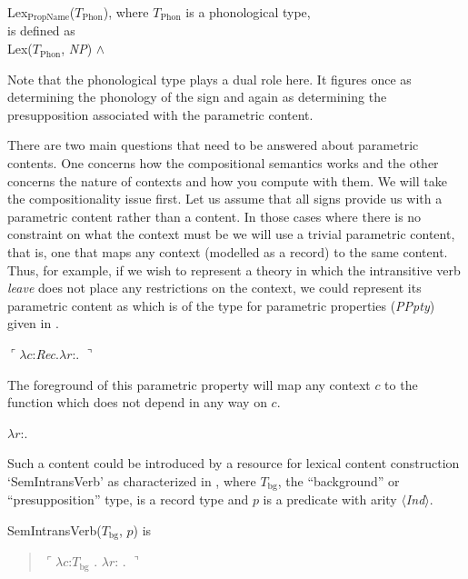\begin{ex} 
Lex$_{\mathrm{PropName}}$($T_{\mathrm{Phon}}$), where
$T_{\mathrm{Phon}}$ is a phonological type,
\\
is defined as \\
Lex($T_{\mathrm{Phon}}$, \textit{NP}) \d{$\wedge$}
\end{ex} 
Note that the phonological type plays a dual role here.  It figures
once as determining the phonology of the sign and again as determining
the presupposition associated with the parametric content.   
  

There are two main questions that need to be answered about parametric
contents.  One concerns how the compositional semantics works and the
other concerns the nature of contexts and how you compute with them.
We will take the compositionality issue first.  Let us assume that all
signs provide us with a parametric content rather than a content.  In
those cases where there is no constraint on what the context must be
we will use a trivial parametric content, that is, one that maps any
context (modelled as a record) to the same content.  Thus, for
example, if we wish to represent a theory in which the intransitive
verb \textit{leave} does not place any restrictions on the context, we
could represent its parametric content as  which is of the
type for parametric properties (\textit{PPpty}) given in .
\begin{ex}
\begin{subex}
\item $\ulcorner\lambda c$:\textit{Rec}.$\lambda r$:.
$\urcorner$

\item {}
\end{subex}
\label{ex:parametricLeave}

\end{ex}
The foreground of this parametric property will map any context $c$ to the function \nexteg{} which does not depend in
any way on $c$.
\begin{ex} 
$\lambda r$:.
\end{ex} 
  
Such a content could be introduced by a resource for
lexical content construction `SemIntransVerb' as characterized in
\nexteg{}, where $T_{\mathrm{bg}}$, the
``background'' or ``presupposition'' type, is a record type and $p$ is a predicate with arity $\langle$\textit{Ind}$\rangle$.
\begin{ex} 
  SemIntransVerb($T_{\mathrm{bg}}$, $p$) is
  \begin{quote}
$\ulcorner\lambda c$:$T_{\mathrm{bg}}$ . $\lambda
r$:
. $\urcorner$
\end{quote}

\end{ex}


